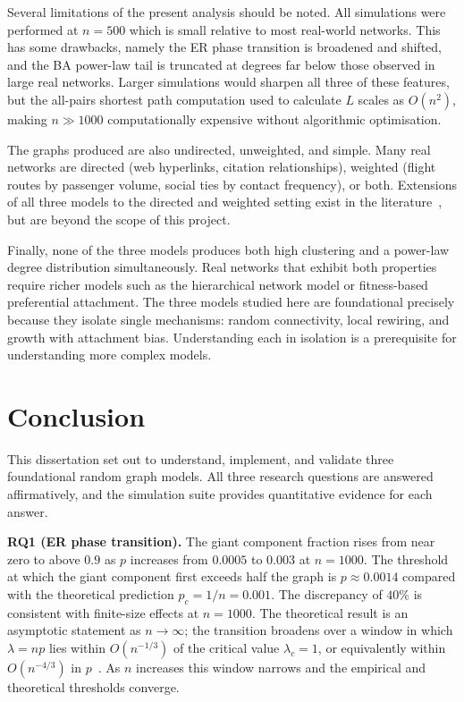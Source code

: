 \documentclass[12pt, a4paper]{report}
\theoremstyle{definition}
\theoremstyle{plain}
\theoremstyle{remark}
\begin{document}
Several limitations of the present analysis should be noted.
All simulations were performed at $n = 500$ which is small
relative to most real-world networks. This has some drawbacks,
namely the ER phase transition is broadened and shifted, and
the BA power-law tail is truncated at degrees far below those
observed in large real networks. Larger simulations would
sharpen all three of these features, but the all-pairs
shortest path computation used to calculate $L$ scales as
$O(n^2)$, making $n \gg 1000$ computationally expensive
without algorithmic optimisation.

The graphs produced are also undirected, unweighted, and
simple. Many real networks are directed (web hyperlinks,
citation relationships), weighted (flight routes by
passenger volume, social ties by contact frequency), or
both. Extensions of all three models to the directed and
weighted setting exist in the literature~\cite[Chs.~6--8]{hofstad2017},
but are beyond the scope of this project.

Finally, none of the three models produces both high
clustering and a power-law degree distribution
simultaneously. Real networks that exhibit both properties require
richer models such as the hierarchical network model or
fitness-based preferential attachment. The three models
studied here are foundational precisely because they isolate
single mechanisms: random connectivity, local rewiring, and
growth with attachment bias. Understanding each in isolation
is a prerequisite for understanding more complex models.


\chapter{Conclusion}
\label{chap:conclusion}

This dissertation set out to understand, implement, and
validate three foundational random graph models. All three
research questions are answered affirmatively, and the
simulation suite provides quantitative evidence for each
answer.

\textbf{RQ1 (ER phase transition).} The giant component
fraction rises from near zero to above $0.9$ as $p$ increases
from $0.0005$ to $0.003$ at $n = 1000$. The
threshold at which the giant component first exceeds half the
graph is $p \approx 0.0014$ compared with the theoretical
prediction $p_c = 1/n = 0.001$. The discrepancy of
$40\%$ is consistent with finite-size effects at $n = 1000$.
The theoretical result is an asymptotic statement as $n \to \infty$;
the transition broadens over a window in which $\lambda = np$ lies
within $O(n^{-1/3})$ of the critical value $\lambda_c = 1$, or
equivalently within $O(n^{-4/3})$ in $p$~\cite[Ch.~5]{hofstad2017}.
As $n$ increases this window narrows and the empirical and theoretical
thresholds converge.
\end{document}
